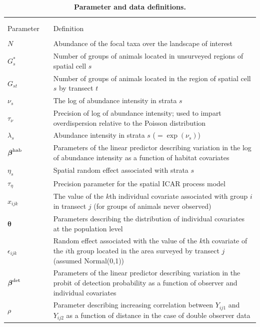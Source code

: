 \documentclass[10pt]{article}
\begin{document}
\begin{table}
\caption{\bf Parameter and data definitions.}
\begin{tabular}{p{1.5cm}l p{12.5cm}}
\hline \hline \\
& & \\
Parameter & & Definition \\
\cline{1-1} \cline{3-3}
& & \\
$N$ & & Abundance of the focal taxa over the landscape of interest\\
$G_s^*$ & & Number of groups of animals located in unsurveyed regions of spatial cell $s$\\
$G_{st}$   & & Number of groups of animals located in the region of spatial cell $s$ by transect $t$\\
$\nu_{s}$ & & The log of abundance intensity in strata $s$\\
$\tau_\nu$ & & Precision of log of abundance intensity; used to impart overdispersion relative to the Poisson distribution \\
$\lambda_{s}$ & & Abundance intensity in strata $s$ ($=\exp(\nu_s)$)\\
$\boldsymbol{\beta}^{\rm hab}$ & & Parameters of the linear predictor describing variation in
        the log of abundance intensity as a function of habitat covariates\\
$\eta_s$ & & Spatial random effect associated with strata $s$\\
$\tau_\eta$ & & Precision parameter for the spatial ICAR process model\\
$x_{ijk}$   & &  The value of the $k$th individual covariate associated with
    group $i$ in transect $j$ (for groups of animals never observed)\\
$\boldsymbol{\theta}$ & & Parameters describing the distribution of individual covariates
                          at the population level \\
$\epsilon_{ijk}$ & & Random effect associated with the value of the $k$th covariate of the
                $i$th group located in the area surveyed by transect $j$ (assumed Normal(0,1))\\
$\boldsymbol{\beta}^{\rm det}$ & & Parameters of the linear predictor describing variation
        in the probit of detection probability as a function of observer and individual covariates \\
$\rho$ & & Parameter describing increasing correlation between $Y_{ij1}$ and $Y_{ij2}$ as a function of distance in the case of double observer data\\

\end{tabular}
\end{table}
\end{document}

